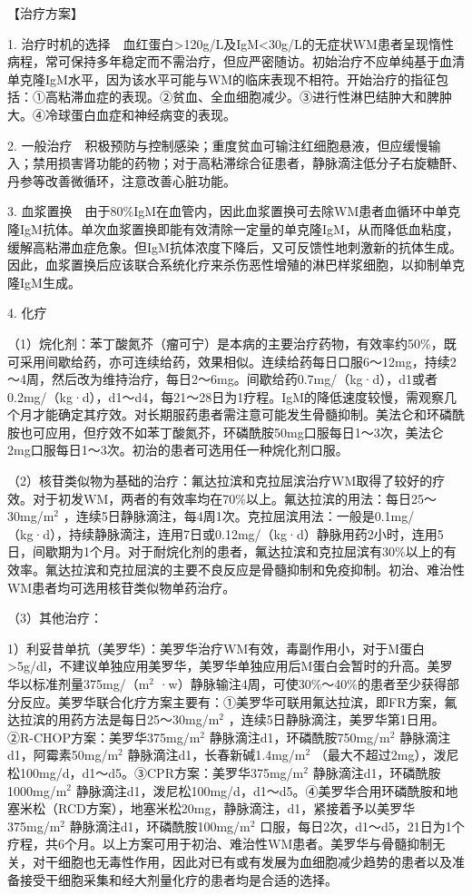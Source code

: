 【治疗方案】

1.
治疗时机的选择　血红蛋白\textgreater{}120g/L及IgM<30g/L的无症状WM患者呈现惰性病程，常可保持多年稳定而不需治疗，但应严密随访。初始治疗不应单纯基于血清单克隆IgM水平，因为该水平可能与WM的临床表现不相符。开始治疗的指征包括：①高粘滞血症的表现。②贫血、全血细胞减少。③进行性淋巴结肿大和脾肿大。④冷球蛋白血症和神经病变的表现。

2.
一般治疗　积极预防与控制感染；重度贫血可输注红细胞悬液，但应缓慢输入；禁用损害肾功能的药物；对于高粘滞综合征患者，静脉滴注低分子右旋糖酐、丹参等改善微循环，注意改善心脏功能。

3.
血浆置换　由于80\%IgM在血管内，因此血浆置换可去除WM患者血循环中单克隆IgM抗体。单次血浆置换即能有效清除一定量的单克隆IgM，从而降低血粘度，缓解高粘滞血症危象。但IgM抗体浓度下降后，又可反馈性地刺激新的抗体生成。因此，血浆置换后应该联合系统化疗来杀伤恶性增殖的淋巴样浆细胞，以抑制单克隆IgM生成。

4. 化疗

（1）烷化剂：苯丁酸氮芥（瘤可宁）是本病的主要治疗药物，有效率约50\%，既可采用间歇给药，亦可连续给药，效果相似。连续给药每日口服6～12mg，持续2～4周，然后改为维持治疗，每日2～6mg。间歇给药0.7mg/（kg·d），d1或者0.2mg/（kg·d），d1～d4，每21～28日为1疗程。IgM的降低速度较慢，需观察几个月才能确定其疗效。对长期服药患者需注意可能发生骨髓抑制。美法仑和环磷酰胺也可应用，但疗效不如苯丁酸氮芥，环磷酰胺50mg口服每日1～3次，美法仑2mg口服每日1～3次。初治的患者可选用任一种烷化剂口服。

（2）核苷类似物为基础的治疗：氟达拉滨和克拉屈滨治疗WM取得了较好的疗效。对于初发WM，两者的有效率均在70\%以上。氟达拉滨的用法：每日25～30mg/m$^2$
，连续5日静脉滴注，每4周1次。克拉屈滨用法：一般是0.1mg/（kg·d），持续静脉滴注，连用7日或0.12mg/（kg·d）静脉用药2小时，连用5日，间歇期为1个月。对于耐烷化剂的患者，氟达拉滨和克拉屈滨有30\%以上的有效率。氟达拉滨和克拉屈滨的主要不良反应是骨髓抑制和免疫抑制。初治、难治性WM患者均可选用核苷类似物单药治疗。

（3）其他治疗：

1）利妥昔单抗（美罗华）：美罗华治疗WM有效，毒副作用小，对于M蛋白\textgreater{}5g/dl，不建议单独应用美罗华，美罗华单独应用后M蛋白会暂时的升高。美罗华以标准剂量375mg/（m$^2$
·w）静脉输注4周，可使30\%～40\%的患者至少获得部分反应。美罗华联合化疗方案主要有：①美罗华可联用氟达拉滨，即FR方案，氟达拉滨的用药方法是每日25～30mg/m$^2$
，连续5日静脉滴注，美罗华第1日用。②R-CHOP方案：美罗华375mg/m$^2$
静脉滴注d1，环磷酰胺750mg/m$^2$ 静脉滴注d1，阿霉素50mg/m$^2$
静脉滴注d1，长春新碱1.4mg/m$^2$
（最大不超过2mg），泼尼松100mg/d，d1～d5。③CPR方案：美罗华375mg/m$^2$
静脉滴注d1，环磷酰胺1000mg/m$^2$
静脉滴注d1，泼尼松100mg/d，d1～d5。④美罗华合用环磷酰胺和地塞米松（RCD方案），地塞米松20mg，静脉滴注，d1，紧接着予以美罗华375mg/m$^2$
静脉滴注d1，环磷酰胺100mg/m$^2$
口服，每日2次，d1～d5，21日为1个疗程，共6个月。以上方案可用于初治、难治性WM患者。美罗华与骨髓抑制无关，对干细胞也无毒性作用，因此对已有或有发展为血细胞减少趋势的患者以及准备接受干细胞采集和经大剂量化疗的患者均是合适的选择。

